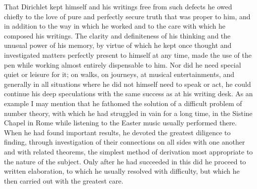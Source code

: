 \documentclass[11pt]{article}
\begin{document}
That Dirichlet kept himself and his writings free from such defects he owed chiefly to the love of pure and perfectly secure truth that was proper to him, and in addition to the way in which he worked and to the care with which he composed his writings. The clarity and definiteness of his thinking and the unusual power of his memory, by virtue of which he kept once thought and investigated matters perfectly present to himself at any time, made the use of the pen while working almost entirely dispensable to him. Nor did he need special quiet or leisure for it; on walks, on journeys, at musical entertainments, and generally in all situations where he did not himself need to speak or act, he could continue his deep speculations with the same success as at his writing desk. As an example I may mention that he fathomed the solution of a difficult problem of number theory, with which he had struggled in vain for a long time, in the Sistine Chapel in Rome while listening to the Easter music usually performed there. When he had found important results, he devoted the greatest diligence to finding, through investigation of their connections on all sides with one another and with related theorems, the simplest method of derivation most appropriate to the nature of the subject. Only after he had succeeded in this did he proceed to written elaboration, to which he usually resolved with difficulty, but which he then carried out with the greatest care.
\end{document}
